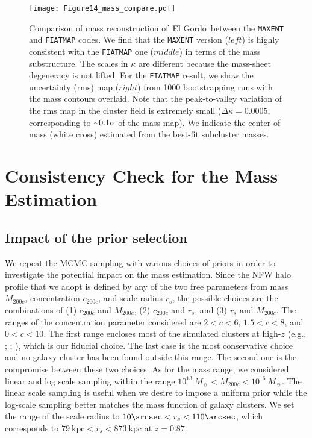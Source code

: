 \documentclass[twocolumn]{aastex631}
\newcommand{\elgordo}{El Gordo}
\newcommand{\mytilde}{\raise.19ex\hbox{$\scriptstyle\sim$}}
\begin{document}
\begin{figure*}
\centering
\texttt{[image: Figure14\_mass\_compare.pdf]}
\caption{Comparison of mass reconstruction of~\elgordo~between 
the {\tt MAXENT} and {\tt FIATMAP} codes. We find that the {\tt MAXENT} version ($left$) is highly consistent with the {\tt FIATMAP} one ($middle$) in terms of the mass substructure.
The scales in $\kappa$ are different because the mass-sheet degeneracy is not lifted. For the {\tt FIATMAP} result, we show the uncertainty (rms) map ($right$) from 1000 bootstrapping runs with the mass contours overlaid.
Note that the peak-to-valley variation of the rms map in the cluster field is extremely small ($\Delta \kappa = 0.0005$, corresponding to $\mytilde0.1\sigma$ of the mass map). 
We indicate the center of mass (white cross) estimated from the best-fit subcluster masses. }
\label{fig:mass_map_comps}
\end{figure*}



\section{Consistency Check for the Mass Estimation} \label{Ap1}
\subsection{Impact of the prior selection} \label{change_priors}
We repeat the MCMC sampling with various choices of priors in order to investigate the potential impact on the mass estimation. 
Since the NFW halo profile that we adopt is defined by any of the two free parameters from mass $M_{200c}$, concentration $c_{200c}$, and scale radius $r_s$, the possible choices are the combinations of (1) $c_{200c}$ and $M_{200c}$, (2) $c_{200c}$ and $r_s$, and (3) $r_s$ and $M_{200c}$. 
The ranges of the concentration parameter considered are $2 < c < 6$, $1.5 < c < 8$, and $ 0 < c < 10$. 
The first range encloses most of the simulated clusters at high-$z$ (e.g., \citealt{Prada2012}; \citealt{Ludlow2014}; \citealt{DM14}), which is our fiducial choice. 
The last case is the most conservative choice and no galaxy cluster has been found outside this range. 
The second one is the compromise between these two choices. 
As for the mass range, we considered linear and log scale sampling within the range $10^{13}~M_{\sun} < M_{200c} < 10^{16}~M_{\sun}$. 
The linear scale sampling is useful when we desire to impose a uniform prior while the log-scale sampling better matches the mass function of galaxy clusters. 
We set the range of the scale radius to $10\arcsec < r_s < 110\arcsec$, which corresponds to $79~\mbox{kpc} < r_s < 873~\mbox{kpc}$ at $z=0.87$. 
\end{document}
